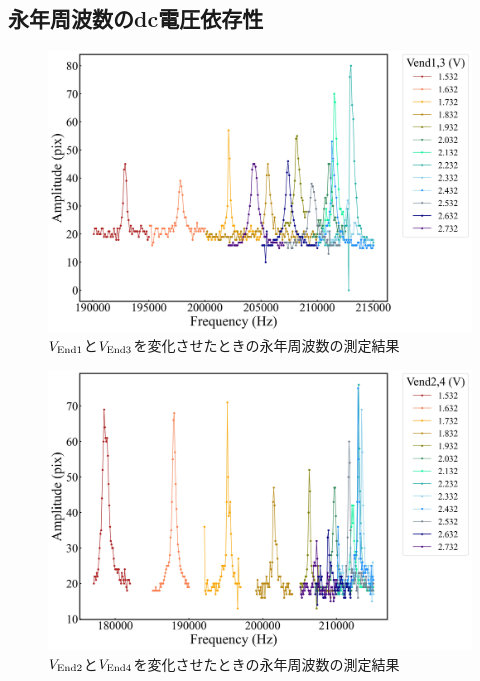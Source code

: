 \subsection{永年周波数のdc電圧依存性}

\begin{figure}[h]
	\begin{center}
		\includegraphics[width = 0.7\linewidth]{./results/figure/end13-SecFreq.jpg}
		\caption{$V_{\rm End1}$と$V_{\rm End3}$を変化させたときの永年周波数の測定結果}
		\label{fig:end13_MeasSec}
	\end{center}
\end{figure}

\begin{figure}[h]
	\begin{center}
		\includegraphics[width = 0.7\linewidth]{./results/figure/end24-SecFreq.jpg}
		\caption{$V_{\rm End2}$と$V_{\rm End4}$を変化させたときの永年周波数の測定結果}
		\label{fig:end24_MeasSec}
	\end{center}
\end{figure}

